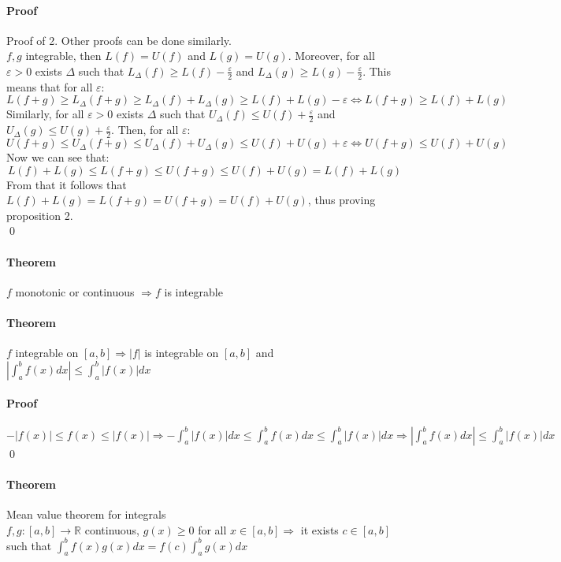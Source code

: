 \documentclass{article}
\newcommand{\abs}[1]{\left|#1\right|}
\newcommand{\functoR}[2]{#1 : #2 \rightarrow \mathbb{R}}
\newcommand{\intcc}[1]{\left[#1\right]}
\newcommand{\Ep}{\varepsilon}
\newcommand{\Theorem}{\paragraph{Theorem}}
\newcommand{\Proof}{\paragraph{Proof}}
\begin{document}
	\Proof Proof of 2. Other proofs can be done similarly.
\\$f,g$ integrable, then $L(f) = U(f)$ and $L(g) = U(g)$. Moreover, for all
	$\Ep > 0$ exists $\Delta$ such that $L_\Delta(f) \geq L(f) - \frac{\Ep}2$ and
	$L_\Delta(g) \geq L(g) - \frac{\Ep}2$. This means that for all $\Ep$:
	\begin{equation*}
		L(f+g) \geq L_\Delta(f+g) \geq L_\Delta(f) + L_\Delta(g) \geq L(f) + L(g) -
		\Ep \iff L(f+g) \geq L(f) + L(g)
	\end{equation*}
	Similarly, for all $\Ep > 0$ exists $\Delta$ such that $U_\Delta(f) \leq U(f)
	+ \frac{\Ep}2$ and $U_\Delta(g) \leq U(g) + \frac{\Ep}2$. Then, for all $\Ep$:
	\begin{equation*}
		U(f+g) \leq U_\Delta(f+g) \leq U_\Delta(f) + U_\Delta(g) \leq U(f) + U(g) +
		\Ep \iff U(f+g) \leq U(f) + U(g)
	\end{equation*}
	Now we can see that:
	\begin{equation*}
		L(f) + L(g) \leq L(f+g) \leq U(f+g) \leq U(f) + U(g) = L(f) + L(g)
	\end{equation*}
	From that it follows that $L(f) + L(g) = L(f+g) = U(f+g) = U(f) + U(g)$, thus
	proving proposition 2.
\\\qed

	\Theorem $f$ monotonic or continuous $\Rightarrow f$ is integrable

	\Theorem $f$ integrable on $\intcc{a,b} \Rightarrow |f|$ is integrable on
	$\intcc{a,b}$ and $\abs{\int_a^b f(x) dx} \leq \int_a^b |f(x)| dx$

	\Proof $-|f(x)| \leq f(x) \leq |f(x)| \Rightarrow -\int_a^b |f(x)| dx \leq
	\int_a^b f(x) dx \leq \int_a^b |f(x)| dx \Rightarrow \abs{\int_a^b f(x) dx}
	\leq \int_a^b |f(x)| dx$
\\\qed

	\Theorem Mean value theorem for integrals
\\$\functoR{f,g}{\intcc{a,b}}$ continuous, $g(x) \geq 0$ for all $x \in
	\intcc{a,b} \Rightarrow$ it exists $c \in \intcc{a,b}$ such that $\int_a^b
	f(x)g(x) dx = f(c) \int_a^b g(x) dx$
\end{document}
